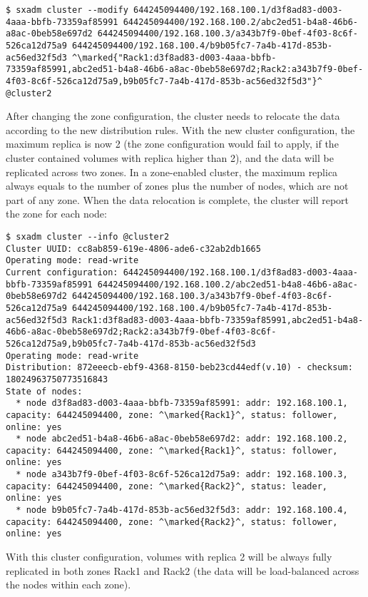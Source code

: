 \else
\begin{lstlisting}
$ sxadm cluster --modify 644245094400/192.168.100.1/d3f8ad83-d003-4aaa-bbfb-73359af85991 644245094400/192.168.100.2/abc2ed51-b4a8-46b6-a8ac-0beb58e697d2 644245094400/192.168.100.3/a343b7f9-0bef-4f03-8c6f-526ca12d75a9 644245094400/192.168.100.4/b9b05fc7-7a4b-417d-853b-ac56ed32f5d3 ^\marked{"Rack1:d3f8ad83-d003-4aaa-bbfb-73359af85991,abc2ed51-b4a8-46b6-a8ac-0beb58e697d2;Rack2:a343b7f9-0bef-4f03-8c6f-526ca12d75a9,b9b05fc7-7a4b-417d-853b-ac56ed32f5d3"}^ @cluster2
\end{lstlisting}
\fi
After changing the zone configuration, the cluster needs to relocate the data
according to the new distribution rules. With the new cluster configuration,
the maximum replica is now 2 (the zone configuration would fail to apply, if
the cluster contained volumes with replica higher than 2), and the data will
be replicated across two zones. In a zone-enabled cluster, the maximum replica
always equals to the number of zones plus the number of nodes, which are not
part of any zone. When the data relocation is complete, the cluster will report
the zone for each node:
\begin{lstlisting}
$ sxadm cluster --info @cluster2
Cluster UUID: cc8ab859-619e-4806-ade6-c32ab2db1665
Operating mode: read-write
Current configuration: 644245094400/192.168.100.1/d3f8ad83-d003-4aaa-bbfb-73359af85991 644245094400/192.168.100.2/abc2ed51-b4a8-46b6-a8ac-0beb58e697d2 644245094400/192.168.100.3/a343b7f9-0bef-4f03-8c6f-526ca12d75a9 644245094400/192.168.100.4/b9b05fc7-7a4b-417d-853b-ac56ed32f5d3 Rack1:d3f8ad83-d003-4aaa-bbfb-73359af85991,abc2ed51-b4a8-46b6-a8ac-0beb58e697d2;Rack2:a343b7f9-0bef-4f03-8c6f-526ca12d75a9,b9b05fc7-7a4b-417d-853b-ac56ed32f5d3
Operating mode: read-write
Distribution: 872eeecb-ebf9-4368-8150-beb23cd44edf(v.10) - checksum: 18024963750773516843
State of nodes:
  * node d3f8ad83-d003-4aaa-bbfb-73359af85991: addr: 192.168.100.1, capacity: 644245094400, zone: ^\marked{Rack1}^, status: follower, online: yes
  * node abc2ed51-b4a8-46b6-a8ac-0beb58e697d2: addr: 192.168.100.2, capacity: 644245094400, zone: ^\marked{Rack1}^, status: follower, online: yes
  * node a343b7f9-0bef-4f03-8c6f-526ca12d75a9: addr: 192.168.100.3, capacity: 644245094400, zone: ^\marked{Rack2}^, status: leader, online: yes
  * node b9b05fc7-7a4b-417d-853b-ac56ed32f5d3: addr: 192.168.100.4, capacity: 644245094400, zone: ^\marked{Rack2}^, status: follower, online: yes
\end{lstlisting}
With this cluster configuration, volumes with replica 2 will be always fully
replicated in both zones Rack1 and Rack2 (the data will be load-balanced across
the nodes within each zone).

